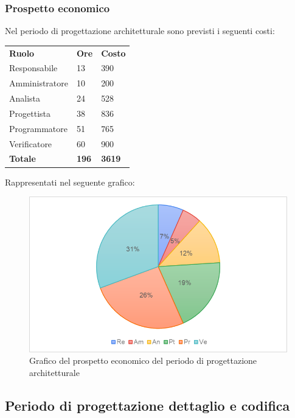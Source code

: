 \subsubsection{Prospetto economico}
Nel periodo di progettazione architetturale sono previsti i seguenti costi:
\begin{longtable} {
		>{}p{32mm}
		>{}p{20mm}
		>{}p{20mm}
	}
	\rowcolor{gray!50}
	
	\textbf{Ruolo} & \textbf{Ore} & \textbf{Costo} \TBstrut \\
	Responsabile & 13 & 390 \TBstrut \\
	Amministratore & 10 & 200 \TBstrut \\
	Analista & 24 & 528 \TBstrut \\
	Progettista & 38 & 836 \TBstrut \\
	Programmatore & 51 & 765 \TBstrut \\
	Verificatore & 60 & 900 \TBstrut \\
	\textbf{Totale} & \textbf{196}& \textbf{3619} \TBstrut \\		
\end{longtable}	
Rappresentati nel seguente grafico: \\
\begin{figure}[H]
	\includegraphics[width=\linewidth]{./img/Grafici/4.png}
	\caption{Grafico del prospetto economico del periodo di progettazione architetturale}
\end{figure}

\subsection{Periodo di progettazione dettaglio e codifica}
